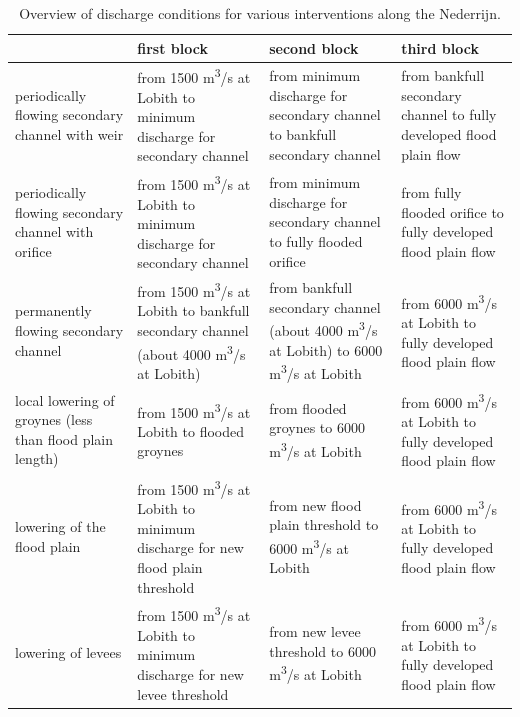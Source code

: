 \begin{table}
\begin{tabular}{p{}|p{}|p{}|p{}}
 & first block & second block & third block \\ \hline
periodically flowing secondary channel with weir & from 1500 m\textsuperscript{3}/s at Lobith to minimum discharge for secondary channel & from minimum discharge for secondary channel to bankfull secondary channel & from bankfull secondary channel to fully developed flood plain flow \\ \hline
periodically flowing secondary channel with orifice & from 1500 m\textsuperscript{3}/s at Lobith to minimum discharge for secondary channel & from minimum discharge for secondary channel to fully flooded orifice & from fully flooded orifice to fully developed flood plain flow \\ \hline
permanently flowing secondary channel & from 1500 m\textsuperscript{3}/s at Lobith to bankfull secondary channel (about 4000 m\textsuperscript{3}/s at Lobith) & from bankfull secondary channel (about 4000 m\textsuperscript{3}/s at Lobith) to 6000 m\textsuperscript{3}/s at Lobith & from 6000 m\textsuperscript{3}/s at Lobith to fully developed flood plain flow \\ \hline
local lowering of groynes (less than flood plain length) & from 1500 m\textsuperscript{3}/s at Lobith to flooded groynes & from flooded groynes to 6000 m\textsuperscript{3}/s at Lobith & from 6000 m\textsuperscript{3}/s at Lobith to fully developed flood plain flow \\ \hline
lowering of the flood plain & from 1500 m\textsuperscript{3}/s at Lobith to minimum discharge for new flood plain threshold & from new flood plain threshold to 6000 m\textsuperscript{3}/s at Lobith & from 6000 m\textsuperscript{3}/s at Lobith to fully developed flood plain flow \\ \hline
lowering of levees & from 1500 m\textsuperscript{3}/s at Lobith to minimum discharge for new levee threshold & from new levee threshold to 6000 m\textsuperscript{3}/s at Lobith & from 6000 m\textsuperscript{3}/s at Lobith to fully developed flood plain flow \\
\end{tabular}

\caption{Overview of discharge conditions for various interventions along the Nederrijn.}
\label{App.Tab2}
\end{table}

